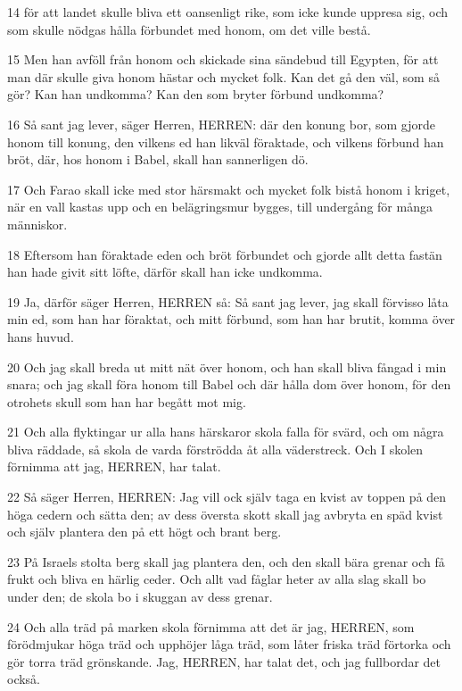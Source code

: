\par 14 för att landet skulle bliva ett oansenligt rike, som icke kunde uppresa sig, och som skulle nödgas hålla förbundet med honom, om det ville bestå.
\par 15 Men han avföll från honom och skickade sina sändebud till Egypten, för att man där skulle giva honom hästar och mycket folk. Kan det gå den väl, som så gör? Kan han undkomma? Kan den som bryter förbund undkomma?
\par 16 Så sant jag lever, säger Herren, HERREN: där den konung bor, som gjorde honom till konung, den vilkens ed han likväl föraktade, och vilkens förbund han bröt, där, hos honom i Babel, skall han sannerligen dö.
\par 17 Och Farao skall icke med stor härsmakt och mycket folk bistå honom i kriget, när en vall kastas upp och en belägringsmur bygges, till undergång för många människor.
\par 18 Eftersom han föraktade eden och bröt förbundet och gjorde allt detta fastän han hade givit sitt löfte, därför skall han icke undkomma.
\par 19 Ja, därför säger Herren, HERREN så: Så sant jag lever, jag skall förvisso låta min ed, som han har föraktat, och mitt förbund, som han har brutit, komma över hans huvud.
\par 20 Och jag skall breda ut mitt nät över honom, och han skall bliva fångad i min snara; och jag skall föra honom till Babel och där hålla dom över honom, för den otrohets skull som han har begått mot mig.
\par 21 Och alla flyktingar ur alla hans härskaror skola falla för svärd, och om några bliva räddade, så skola de varda förströdda åt alla väderstreck. Och I skolen förnimma att jag, HERREN, har talat.
\par 22 Så säger Herren, HERREN: Jag vill ock själv taga en kvist av toppen på den höga cedern och sätta den; av dess översta skott skall jag avbryta en späd kvist och själv plantera den på ett högt och brant berg.
\par 23 På Israels stolta berg skall jag plantera den, och den skall bära grenar och få frukt och bliva en härlig ceder. Och allt vad fåglar heter av alla slag skall bo under den; de skola bo i skuggan av dess grenar.
\par 24 Och alla träd på marken skola förnimma att det är jag, HERREN, som förödmjukar höga träd och upphöjer låga träd, som låter friska träd förtorka och gör torra träd grönskande. Jag, HERREN, har talat det, och jag fullbordar det också.

